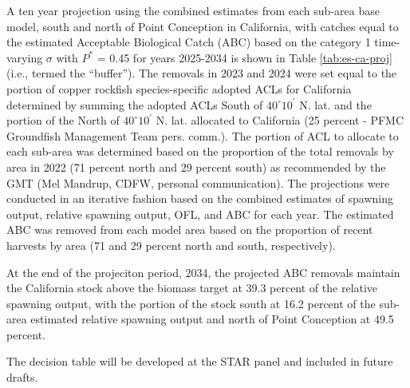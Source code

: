 \documentclass[11pt,
  english,
  letterpaper,
]{article}
\begin{document}
A ten year projection using the combined estimates from each sub-area base model, south and north of Point Conception in California, with catches equal to the estimated Acceptable Biological Catch (ABC) based on the category 1 time-varying \(\sigma\) with \(P^*\) = 0.45 for years 2025-2034 is shown in Table \ref{tab:es-ca-proj} (i.e., termed the ``buffer''). The removals in 2023 and 2024 were set equal to the portion of copper rockfish species-specific adopted ACLs for California determined by summing the adopted ACLs South of $40^\circ 10^\prime$ N. lat. and the portion of the North of $40^\circ 10^\prime$ N. lat. allocated to California (25 percent - PFMC Groundfish Management Team pers. comm.). The portion of ACL to allocate to each sub-area was determined based on the proportion of the total removals by area in 2022 (71 percent north and 29 percent south) as recommended by the GMT (Mel Mandrup, CDFW, personal communication). The projections were conducted in an iterative fashion based on the combined estimates of spawning output, relative spawning output, OFL, and ABC for each year. The estimated ABC was removed from each model area based on the proportion of recent harvests by area (71 and 29 percent north and south, respectively).

At the end of the projeciton period, 2034, the projected ABC removals maintain the California stock above the biomass target at 39.3 percent of the relative spawning output, with the portion of the stock south at 16.2 percent of the sub-area estimated relative spawning output and north of Point Conception at 49.5 percent.

The decision table will be developed at the STAR panel and included in future drafts.

\begingroup\fontsize{9}{11}\selectfont
\end{document}
